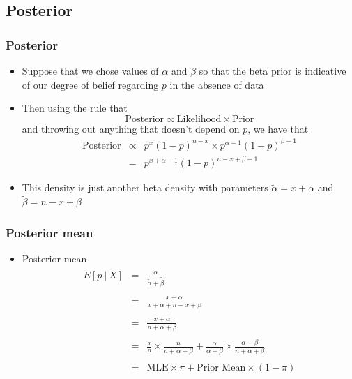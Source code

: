 \documentclass[aspectratio=169]{beamer}
\begin{document}
\subsection{Posterior}
\begin{frame}\frametitle{Posterior}
\begin{itemize}
\item Suppose that we chose values of $\alpha$ and $\beta$ so that
  the beta prior is indicative of our degree of belief regarding $p$
  in the absence of data
\item Then using the rule that
  $$
  \mbox{Posterior} \propto \mbox{Likelihood} \times \mbox{Prior}
  $$
  and throwing out anything that doesn't depend on $p$, we have that
\begin{eqnarray*}
\mbox{Posterior} &\propto & p^x(1 - p)^{n-x} \times p^{\alpha -1} (1 - p)^{\beta - 1} \\
                 &  =     & p^{x + \alpha - 1} (1 - p)^{n - x + \beta - 1}
\end{eqnarray*}
\item This density is just another beta density with parameters
  $\tilde \alpha = x + \alpha$ and $\tilde \beta = n - x + \beta$
\end{itemize}
\end{frame}

\begin{frame}\frametitle{Posterior mean}
\begin{itemize}
\item Posterior mean 
 \begin{eqnarray*}
E[p ~|~ X] & = &  \frac{\tilde \alpha}{\tilde \alpha + \tilde \beta}\\ \\
& = & \frac{x + \alpha}{x + \alpha + n - x + \beta}\\ \\
& = & \frac{x + \alpha}{n + \alpha + \beta} \\ \\
& = & \frac{x}{n} \times \frac{n}{n + \alpha + \beta} + \frac{\alpha}{\alpha + \beta} \times \frac{\alpha + \beta}{n + \alpha + \beta} \\ \\
& = & \mbox{MLE} \times \pi + \mbox{Prior Mean} \times (1 - \pi)
  \end{eqnarray*}
\end{itemize}
\end{frame}
\end{document}
